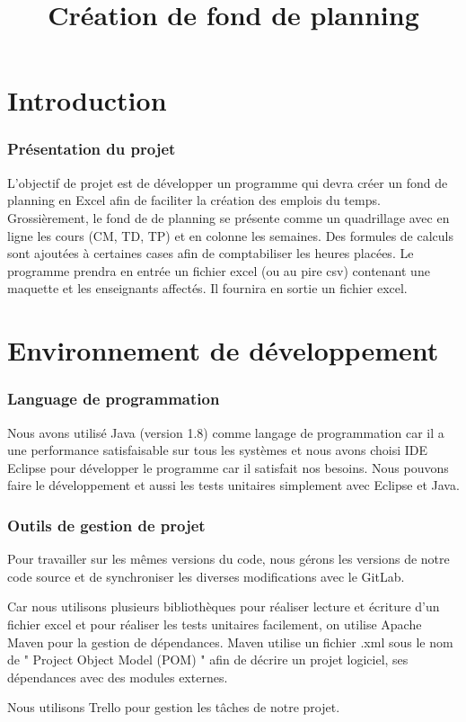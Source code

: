 \documentclass{polytech/polytech}
\title{Création de fond de planning}
\begin{document}
	\part{Introduction}
	\section{Présentation du projet}
	L’objectif de projet est de développer un programme qui devra créer un fond de planning en Excel afin de faciliter la création des emplois du temps. Grossièrement, le fond de de planning se présente comme un quadrillage avec en ligne les cours (CM, TD, TP) et en colonne les semaines. Des formules de calculs sont ajoutées à certaines cases afin de comptabiliser les heures placées. Le programme prendra en entrée un fichier excel (ou au pire csv) contenant une maquette et les enseignants affectés. Il fournira en sortie un fichier excel.
	\part{Environnement de développement}
	\section{Language de programmation}
	Nous avons utilisé Java (version 1.8) comme langage de programmation car il a une performance satisfaisable sur tous les systèmes et nous avons choisi IDE Eclipse pour développer le programme car il satisfait nos besoins. Nous pouvons faire le développement et aussi les tests unitaires simplement avec Eclipse et Java.

	\section{Outils de gestion de projet}
	Pour travailler sur les mêmes versions du code, nous gérons les versions de notre code source et de synchroniser les diverses modifications avec le GitLab.

	Car nous utilisons plusieurs bibliothèques pour réaliser lecture et écriture d'un fichier excel et pour réaliser les tests unitaires facilement, on utilise Apache Maven pour la gestion de dépendances. Maven utilise un fichier .xml sous le nom de " Project Object Model (POM) " afin de décrire un projet logiciel, ses dépendances avec des modules externes.

	Nous utilisons Trello pour gestion les tâches de notre projet.
\end{document}
